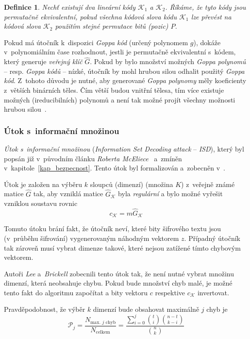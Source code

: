 \documentclass[thesis=M,czech,hidelinks]{FITthesis}[2012/06/26]
\newcommand{\0}{{\textcolor[gray]{0.80}{0}}}
\newtheorem{definice}{Definice}
\begin{document}
\begin{definice}
    Nechť existují dva lineární kódy $\mathcal{K}_1$ a $\mathcal{K}_2$. Říkáme,
    že tyto kódy jsou \emph{permutačně ekvivalentní}, pokud všechna kódová slova
    kódu $\mathcal{K}_1$ lze převést na kódová slova $\mathcal{K}_2$ použitím
    stejné permutace bitů (pozic) $P$.
\end{definice}

Pokud má útočník k~dispozici \emph{Goppa kód} (určený polynomem $g$), dokáže
v~polynomiálním čase rozhodnout, jestli je permutačně ekvivalentní s~kódem,
který generuje \emph{veřejný klíč} $\hat{G}$. Pokud by bylo množství možných
\emph{Goppa polynomů} -- resp. \emph{Goppa kódů} -- nízké, útočník by mohl
hrubou silou odhalit použitý \emph{Goppa kód}. Z~tohoto důvodu je nutné, aby
generované \emph{Goppa polynomy} měly koeficienty z~větších binárních těles. Čím
větší budou vnitřní tělesa, tím více existuje možných (ireducibilních) polynomů
a není tak možné projít všechny možnosti hrubou silou~\cite{Repka}.

\subsubsection{Útok s~informační množinou}

\emph{Útok s~informační množinou} (\emph{Information Set Decoding attack} --
\emph{ISD}), který byl popsán již v~původním článku \emph{Roberta
McEliece}~\cite{McEliece} a~zmíněn v~kapitole~\ref{kap_bezpecnost}. Tento útok
byl formalizován a~zobecněn v~\cite{Lee}.

Útok je založen na výběru $k$ sloupců (dimenzí) (množina $K$) z~veřejně známé
matice $\hat{G}$ tak, aby vzniklá matice $\hat{G}_{\mathcal{K}}$ byla
\emph{regulární} a bylo možné vyřešit vzniklou soustavu rovnic
$$ c_{\mathcal{K}} = m \hat{G}_{\mathcal{K}} $$

Tomuto útoku brání fakt, že útočník neví, které bity šifrového textu jsou
(v~průběhu šifrování)  vygenerovaným náhodným vektorem $z$.
Případný útočník tak zároveň musí vybrat dimenze takové, které nejsou zatížené
tímto chybovým vektorem.

Autoři \emph{Lee} a~\emph{Brickell} zobecnili tento útok tak, že není nutné
vybrat množinu dimenzí, která neobsahuje chybu. Pokud bude množství chyb malé,
je možné tento fakt do algoritmu započítat a bity vektoru $c$ respektive
$c_{\mathcal{K}}$ invertovat.

Pravděpodobnost, že výběr $k$ dimenzí bude obsahovat maximálně $j$ chyb je
$$
    \mathcal{P}_j= \frac{N_{\text{max. $j$ chyb}}}{N_{\text{celkem}}}
    = \frac{\sum_{i=0}^{j}\binom{t}{i}\binom{n-t}{k-i}}{\binom{n}{k}}
$$
\end{document}
